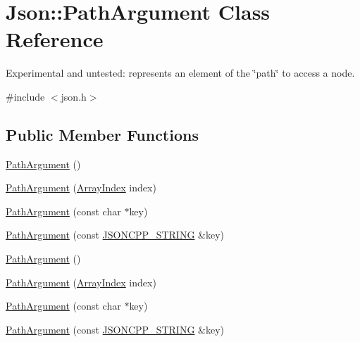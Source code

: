 \hypertarget{class_json_1_1_path_argument}{}\section{Json\+:\+:Path\+Argument Class Reference}
\label{class_json_1_1_path_argument}


Experimental and untested\+: represents an element of the \char`\"{}path\char`\"{} to access a node.  




{\ttfamily \#include $<$json.\+h$>$}

\subsection*{Public Member Functions}
\begin{DoxyCompactItemize}
\item 
\hyperlink{class_json_1_1_path_argument_a3c96ed20c56a55eb76d37a11553c528e}{Path\+Argument} ()
\item 
\hyperlink{class_json_1_1_path_argument_a53c5b27143b161301b95fd544c139ecf}{Path\+Argument} (\hyperlink{namespace_json_a8048e741f2177c3b5d9ede4a5b8c53c2}{Array\+Index} index)
\item 
\hyperlink{class_json_1_1_path_argument_a9690417a8a40e6e49f2acdf6c9281345}{Path\+Argument} (const char $\ast$key)
\item 
\hyperlink{class_json_1_1_path_argument_ac15f25452124fbf21218897113015301}{Path\+Argument} (const \hyperlink{config_8h_a1e723f95759de062585bc4a8fd3fa4be}{J\+S\+O\+N\+C\+P\+P\+\_\+\+S\+T\+R\+I\+NG} \&key)
\item 
\hyperlink{class_json_1_1_path_argument_a3c96ed20c56a55eb76d37a11553c528e}{Path\+Argument} ()
\item 
\hyperlink{class_json_1_1_path_argument_a53c5b27143b161301b95fd544c139ecf}{Path\+Argument} (\hyperlink{namespace_json_a8048e741f2177c3b5d9ede4a5b8c53c2}{Array\+Index} index)
\item 
\hyperlink{class_json_1_1_path_argument_a9690417a8a40e6e49f2acdf6c9281345}{Path\+Argument} (const char $\ast$key)
\item 
\hyperlink{class_json_1_1_path_argument_ac15f25452124fbf21218897113015301}{Path\+Argument} (const \hyperlink{config_8h_a1e723f95759de062585bc4a8fd3fa4be}{J\+S\+O\+N\+C\+P\+P\+\_\+\+S\+T\+R\+I\+NG} \&key)
\end{DoxyCompactItemize}
